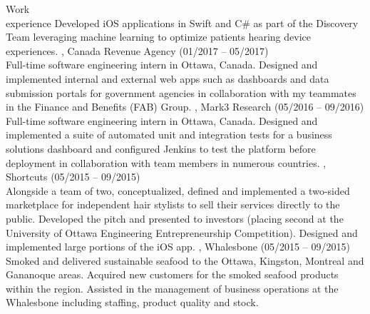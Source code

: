 \documentclass{resume}
\begin{document}
\begin{category}{Work \\experience}
Developed iOS applications in Swift and C\# as part of the Discovery Team leveraging machine
learning to optimize patients hearing device experiences.
, Canada Revenue Agency (01/2017 -- 05/2017)\\
Full-time software engineering intern in Ottawa, Canada. Designed and implemented internal
and external web apps such as dashboards and data submission portals for government agencies
in collaboration with my teammates in the Finance and Benefits (FAB) Group.
, Mark3 Research (05/2016 -- 09/2016)\\
Full-time software engineering intern in Ottawa, Canada. Designed and implemented a suite
of automated unit and integration tests for a business solutions dashboard and configured
Jenkins to test the platform before deployment in collaboration with team members in
numerous countries.
, Shortcuts (05/2015 -- 09/2015)\\
Alongside a team of two, conceptualized, defined and implemented a two-sided marketplace for
independent hair stylists to sell their services directly to the public. Developed
the pitch and presented to investors (placing second at the University of
Ottawa Engineering Entrepreneurship Competition).
Designed and implemented large portions of the iOS app.
, Whalesbone (05/2015 -- 09/2015)\\
Smoked and delivered sustainable seafood to the Ottawa, Kingston, Montreal
and Gananoque areas. Acquired new customers for the smoked seafood products within the region.
Assisted in the management of business operations at the Whalesbone including staffing,
product quality and stock.
\end{category}



\end{document}
